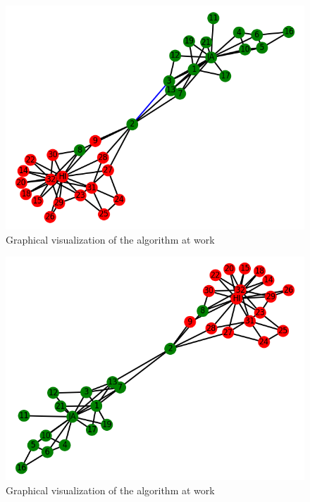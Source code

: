 \documentclass[11pt]{article}
\begin{document}
	\begin{figure}[h!]
		\includegraphics[scale=0.5]{resources/myplot6.png}
		\caption{Graphical visualization of the algorithm at work }
	\end{figure}
	\begin{figure}[h!]
		\includegraphics[scale=0.5]{resources/myplot5.png}
		\caption{Graphical visualization of the algorithm at work }
	\end{figure}
\end{document}
